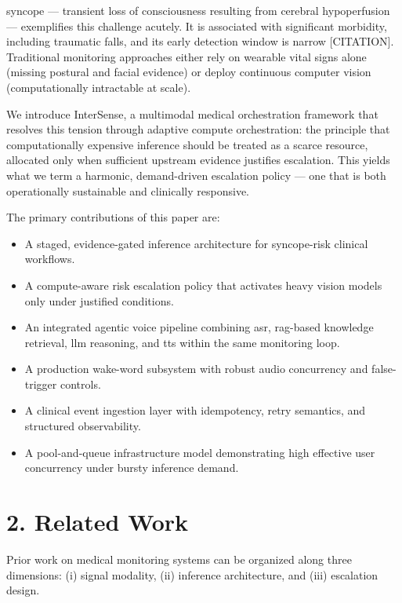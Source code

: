 \documentclass[11pt,a4paper]{article}
\begin{document}
\gls{syncope} — transient loss of consciousness resulting from cerebral hypoperfusion — exemplifies this challenge acutely. It is associated with significant morbidity, including traumatic falls, and its early detection window is narrow [CITATION]. Traditional monitoring approaches either rely on wearable vital signs alone (missing postural and facial evidence) or deploy continuous computer vision (computationally intractable at scale).

We introduce InterSense, a multimodal medical orchestration framework that resolves this tension through adaptive compute orchestration: the principle that computationally expensive inference should be treated as a scarce resource, allocated only when sufficient upstream evidence justifies escalation. This yields what we term a harmonic, demand-driven escalation policy — one that is both operationally sustainable and clinically responsive.

\noindent The primary contributions of this paper are:
\begin{itemize}[leftmargin=1.4em]
  \item A staged, evidence-gated inference architecture for \gls{syncope}-risk clinical workflows.
  \item A compute-aware risk escalation policy that activates heavy vision models only under justified conditions.
  \item An integrated agentic voice pipeline combining \gls{asr}, \gls{rag}-based knowledge retrieval, \gls{llm} reasoning, and \gls{tts} within the same monitoring loop.
  \item A production wake-word subsystem with robust audio concurrency and false-trigger controls.
  \item A clinical event ingestion layer with idempotency, retry semantics, and structured observability.
  \item A pool-and-queue infrastructure model demonstrating high effective user concurrency under bursty inference demand.
\end{itemize}

\section{2. Related Work}
Prior work on medical monitoring systems can be organized along three dimensions: (i) signal modality, (ii) inference architecture, and (iii) escalation design.
\end{document}
